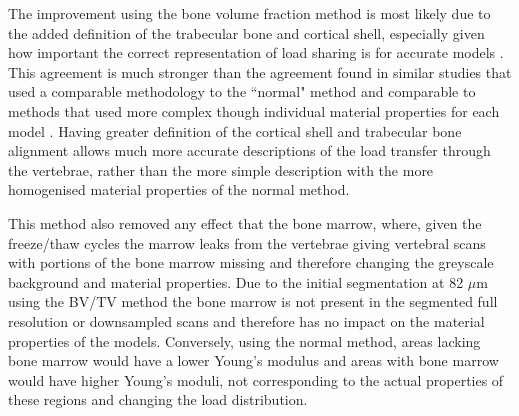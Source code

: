 The improvement using the bone volume fraction method is most likely due to the
added definition of the trabecular bone and cortical shell, especially given
how important the correct representation of load sharing is for accurate models
\cite{eswaran2006cortical}. This agreement is much stronger than the agreement
found in similar studies that used a comparable methodology to the ``normal"
method \cite{Wijayathunga2008, zapata2017methodology, RobsonBrown2014} and
comparable to methods that used more complex though individual material
properties for each model \cite{Kinzl2012,kinzl2013experimentally}.  Having
greater definition of the cortical shell and trabecular bone alignment allows
much more accurate descriptions of the load transfer through the vertebrae,
rather than the more simple description with the more homogenised material
properties of the normal method.

This method also removed any effect that the bone marrow, where, given the
freeze/thaw cycles the marrow leaks from the vertebrae giving vertebral scans
with portions of the bone marrow missing and therefore changing the greyscale
background and material properties.  Due to the initial segmentation at 82
$\mu$m using the BV/TV method the bone marrow is not present in the segmented
full resolution or downsampled scans and therefore has no impact on the
material properties of the models.  Conversely, using the normal method, areas
lacking bone marrow would have a lower Young's modulus and areas with bone
marrow would have higher Young's moduli, not corresponding to the actual
properties of these regions and changing the load distribution.

